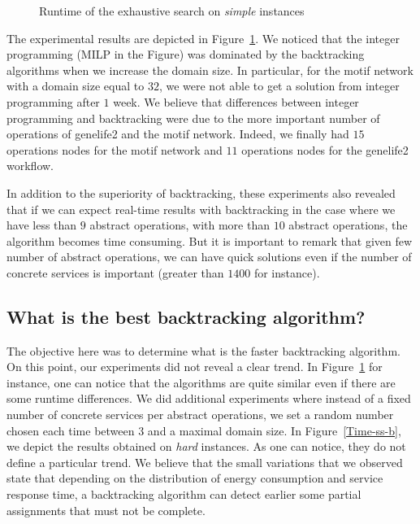 \documentclass[a4paper]{article}
\begin{document}
\begin{figure}[ht]
\centering
{}


\caption{Runtime of the exhaustive search on {\it simple} instances}
\label{Time-ss-Exh}
\end{figure}

The experimental results are depicted in Figure~\ref{Time-ss-Exh}. 
We noticed that the integer programming (MILP in the Figure) was dominated by the backtracking 
algorithms when we increase the domain size. In particular, for the motif network with a domain 
size equal to $32$, we were not able to get a solution from integer programming after $1$ week. 
We believe that differences between integer programming and backtracking were due to the 
more important number of operations of genelife2 and the motif network. Indeed, we finally had 
 $15$ operations nodes for the motif network and $11$ operations nodes for the genelife2 workflow. 

In addition to the superiority of backtracking, these experiments also revealed that if 
we can expect real-time results with backtracking in the case where we have less than $9$ 
abstract operations, with more than $10$ abstract operations, the algorithm becomes time 
consuming. But it is important to remark that given few number of abstract operations, we 
can have quick solutions even if the number of concrete services is important (greater than $1400$ 
for instance). 

\subsection{What is the best backtracking algorithm?}

The objective here was to determine what is the faster backtracking algorithm. 
On this point, our experiments did not reveal a clear trend. In Figure~\ref{Time-ss-Exh} 
for instance, one can notice that the algorithms are quite similar even if there are some runtime 
differences. We did additional experiments where instead of a fixed number of concrete services 
per abstract operations, we set a random number chosen each time between $3$ and a maximal 
domain size. In Figure~\ref{Time-ss-b}, we depict the results obtained on {\it hard }
instances. As one can notice, they do not define a particular trend. We believe that the small variations 
that we observed state that depending on the distribution of energy consumption and service response time, 
a backtracking algorithm can detect earlier some partial assignments that must not be complete. 
\end{document}
